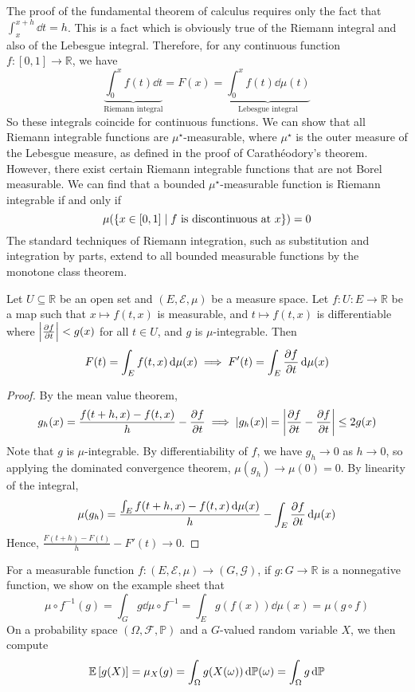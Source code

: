 \begin{remark}
	The proof of the fundamental theorem of calculus requires only the fact that \( \int_x^{x + h} \dd{t} = h \).
	This is a fact which is obviously true of the Riemann integral and also of the Lebesgue integral.
	Therefore, for any continuous function \( f \colon [0,1] \to \mathbb R \), we have
	\[ \underbrace{\int_0^x f(t) \dd{t}}_{\text{Riemann integral}} = F(x) = \underbrace{\int_0^x f(t) \dd{\mu(t)}}_{\text{Lebesgue integral}} \]
	So these integrals coincide for continuous functions.
	We can show that all Riemann integrable functions are \( \mu^\star \)-measurable, where \( \mu^\star \) is the outer measure of the Lebesgue measure, as defined in the proof of Carath\'eodory's theorem.
	However, there exist certain Riemann integrable functions that are not Borel measurable.
	We can find that a bounded \( \mu^\star \)-measurable function is Riemann integrable if and only if
	\[ \mu\qty(\qty{x \in [0,1] \mid f \text{ is discontinuous at } x}) = 0 \]
	The standard techniques of Riemann integration, such as substitution and integration by parts, extend to all bounded measurable functions by the monotone class theorem.
\end{remark}
\begin{theorem}
	Let \( U \subseteq \mathbb R \) be an open set and \( (E, \mathcal E, \mu) \) be a measure space.
	Let \( f \colon U \colon E \to \mathbb R \) be a map such that \( x \mapsto f(t, x) \) is measurable, and \( t \mapsto f(t,x) \) is differentiable where \( \abs{\pdv{f}{t}} < g(x) \) for all \( t \in U \), and \( g \) is \( \mu \)-integrable.
	Then
	\[ F(t) = \int_E f(t,x) \dd{\mu(x)} \implies F'(t) = \int_E \pdv{f}{t}(t,x) \dd{\mu(x)} \]
\end{theorem}
\begin{proof}
	By the mean value theorem,
	\[ g_h(x) = \frac{f(t + h, x) - f(t, x)}{h} - \pdv{f}{t}(t,x) \implies \abs{g_h(x)} = \abs{\pdv{f}{t}(\widetilde t, x) - \pdv{f}{t}(t, x)} \leq 2g(x) \]
	Note that \( g \) is \( \mu \)-integrable.
	By differentiability of \( f \), we have \( g_h \to 0 \) as \( h \to 0 \), so applying the dominated convergence theorem, \( \mu(g_h) \to \mu(0) = 0 \).
	By linearity of the integral,
	\[ \mu(g_h) = \frac{\int_E f(t + h, x) - f(t, x) \dd{\mu(x)}}{h} - \int_E \pdv{f}{t}(t,x) \dd{\mu(x)} \]
	Hence, \( \frac{F(t+h) - F(t)}{h} - F'(t) \to 0 \).
\end{proof}
\begin{example}
	For a measurable function \( f \colon (E, \mathcal E, \mu) \to (G, \mathcal G) \), if \( g \colon G \to \mathbb R \) is a nonnegative function, we show on the example sheet that
	\[ \mu \circ f^{-1}(g) = \int_G g \dd{\mu\circ f^{-1}} = \int_E g(f(x)) \dd{\mu(x)} = \mu(g \circ f) \]
	On a probability space \( (\Omega, \mathcal F, \mathbb P) \) and a \( G \)-valued random variable \( X \), we then compute
	\[ \mathbb{E}\left[{g(X)}\right] = \mu_X(g) = \int_\Omega g(X(\omega)) \dd{\mathbb P(\omega)} = \int_\Omega g \dd{\mathbb {P}} \]
\end{example}
